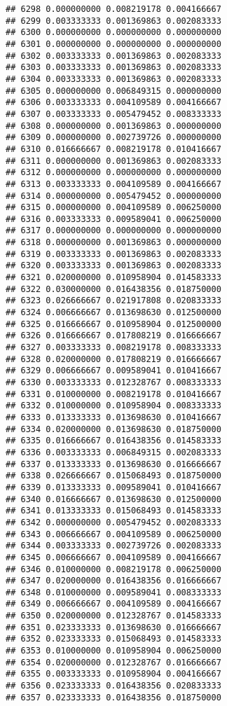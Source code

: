 \documentclass[
]{article}
\begin{document}
\begin{verbatim}
## 6298 0.000000000 0.008219178 0.004166667
## 6299 0.003333333 0.001369863 0.002083333
## 6300 0.000000000 0.000000000 0.000000000
## 6301 0.000000000 0.000000000 0.000000000
## 6302 0.003333333 0.001369863 0.002083333
## 6303 0.003333333 0.001369863 0.002083333
## 6304 0.003333333 0.001369863 0.002083333
## 6305 0.000000000 0.006849315 0.000000000
## 6306 0.003333333 0.004109589 0.004166667
## 6307 0.003333333 0.005479452 0.008333333
## 6308 0.000000000 0.001369863 0.000000000
## 6309 0.000000000 0.002739726 0.000000000
## 6310 0.016666667 0.008219178 0.010416667
## 6311 0.000000000 0.001369863 0.002083333
## 6312 0.000000000 0.000000000 0.000000000
## 6313 0.003333333 0.004109589 0.004166667
## 6314 0.000000000 0.005479452 0.000000000
## 6315 0.000000000 0.004109589 0.006250000
## 6316 0.003333333 0.009589041 0.006250000
## 6317 0.000000000 0.000000000 0.000000000
## 6318 0.000000000 0.001369863 0.000000000
## 6319 0.003333333 0.001369863 0.002083333
## 6320 0.003333333 0.001369863 0.002083333
## 6321 0.020000000 0.010958904 0.014583333
## 6322 0.030000000 0.016438356 0.018750000
## 6323 0.026666667 0.021917808 0.020833333
## 6324 0.006666667 0.013698630 0.012500000
## 6325 0.016666667 0.010958904 0.012500000
## 6326 0.016666667 0.017808219 0.016666667
## 6327 0.003333333 0.008219178 0.008333333
## 6328 0.020000000 0.017808219 0.016666667
## 6329 0.006666667 0.009589041 0.010416667
## 6330 0.003333333 0.012328767 0.008333333
## 6331 0.010000000 0.008219178 0.010416667
## 6332 0.010000000 0.010958904 0.008333333
## 6333 0.013333333 0.013698630 0.010416667
## 6334 0.020000000 0.013698630 0.018750000
## 6335 0.016666667 0.016438356 0.014583333
## 6336 0.003333333 0.006849315 0.002083333
## 6337 0.013333333 0.013698630 0.016666667
## 6338 0.026666667 0.015068493 0.018750000
## 6339 0.013333333 0.009589041 0.010416667
## 6340 0.016666667 0.013698630 0.012500000
## 6341 0.013333333 0.015068493 0.014583333
## 6342 0.000000000 0.005479452 0.002083333
## 6343 0.006666667 0.004109589 0.006250000
## 6344 0.003333333 0.002739726 0.002083333
## 6345 0.006666667 0.004109589 0.004166667
## 6346 0.010000000 0.008219178 0.006250000
## 6347 0.020000000 0.016438356 0.016666667
## 6348 0.010000000 0.009589041 0.008333333
## 6349 0.006666667 0.004109589 0.004166667
## 6350 0.020000000 0.012328767 0.014583333
## 6351 0.023333333 0.013698630 0.016666667
## 6352 0.023333333 0.015068493 0.014583333
## 6353 0.010000000 0.010958904 0.006250000
## 6354 0.020000000 0.012328767 0.016666667
## 6355 0.003333333 0.010958904 0.004166667
## 6356 0.023333333 0.016438356 0.020833333
## 6357 0.023333333 0.016438356 0.018750000

\end{verbatim}
\end{document}
